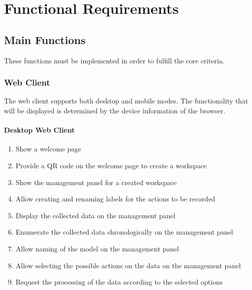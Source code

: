 \section{Functional Requirements}

\subsection{Main Functions}
These functions must be implemented in order to fulfill the core criteria.

\subsubsection{Web Client}
The web client supports both desktop and mobile modes. The functionality that will be displayed is determined by the device information of the browser.

\paragraph{Desktop Web Client}

\def\twodigits#1{%
  \ifnum#1<10 0\fi
  \number#1}

\begin{enumerate}[{label = \textbf{/F{\protect\twodigits{\arabic{enumi}}}0/}, leftmargin = *}]
    \item Show a welcome page
    \item Provide a QR code on the welcome page to create a \gls{workspace}
    \item Show the management panel for a created workspace
    \item Allow creating and renaming labels for the actions to be recorded
    \item Display the collected data on the management panel
    \item Enumerate the collected data chronologically on the management panel
    \item Allow naming of the model on the management panel
    \item Allow selecting the possible actions on the data on the management panel %
    \item Request the processing of the data according to the selected options
\end{enumerate}

